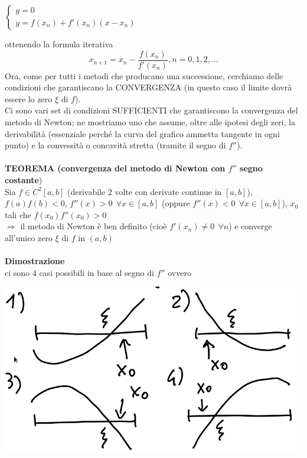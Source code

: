 \documentclass[12pt]{article}
\begin{document}
\begin{center}
    $\begin{cases}
        y=0\\
        y=f(x_n)+f'(x_n)(x-x_n)
    \end{cases}$
\end{center}
ottenendo la formula iterativa\\
\begin{equation*}
    x_{n+1}=x_n-\frac{f(x_n)}{f'(x_n)}, n=0,1,2,...
\end{equation*}
Ora, come per tutti i metodi che producano una successione, cerchiamo delle condizioni che garantiscano la CONVERGENZA (in questo caso il limite dovrà essere lo zero $\xi$ di $f$).\\
Ci sono vari set di condizioni SUFFICIENTI che garantiscono la convergenza del metodo di Newton; ne mostriamo uno che assume, oltre alle ipotesi degli zeri, la derivabilità (essenziale perché la curva del grafico ammetta tangente in ogni punto) e la convessità o concavità stretta (tramite il segno di $f''$).\\\\
\textbf{TEOREMA (convergenza del metodo di Newton con $f''$ segno costante})\\
Sia $f \in C^2[a,b]$ (derivabile 2 volte con derivate continue in $[a,b]$), $f(a)f(b)<0$, $f''(x)>0 \ \ \forall x \in [a,b]$ (oppure $f''(x)<0 \ \ \forall x \in [a,b]$), $x_0$ tali che $f(x_0)f''(x_0)>0$\\
$\Rightarrow$ il metodo di Newton è ben definito (cioè $f'(x_n) \neq 0 \ \ \forall n$) e converge all'unico zero $\xi$ di $f$ in $(a,b)$\\\\
\textbf{Dimostrazione}\\
ci sono 4 casi possibili in base al segno di $f''$ ovvero
\begin{center}
    \includegraphics[scale=0.4]{pagina11_1.png}
\end{center}
\end{document}
